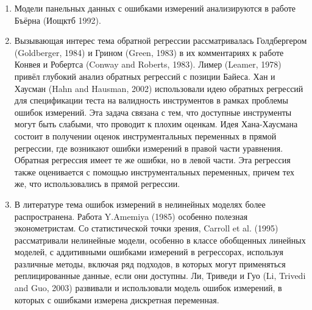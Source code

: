 \begin{enumerate}
\item Модели панельных данных с ошибками измерений анализируются в работе Бъёрна (Иощктб 1992).
\item Вызывающая интерес тема обратной регрессии рассматривалась Голдбергером (Goldberger, 1984) и Грином (Green, 1983) в их комментариях к работе Конвея и Робертса (Conway and Roberts, 1983). Лимер (Leamer, 1978) привёл глубокий анализ обратных регрессий с позиции Байеса. Хан и Хаусман (Hahn and Hausman, 2002) использовали идею обратных регрессий для спецификации теста на валидность инструментов в рамках проблемы ошибок измерений. Эта задача связана с тем, что доступные инструменты могут быть слабыми, что проводит к плохим оценкам. Идея Хана-Хаусмана состоит в получении оценок инструментальных переменных в прямой регрессии, где возникают ошибки измерений в правой части уравнения. Обратная регрессия имеет те же ошибки, но в левой части. Эта регрессия также оценивается с помощью инструментальных переменных, причем тех же, что использовались в прямой регрессии.
\item В литературе тема ошибок измерений в нелинейных моделях более распространена. Работа Y.Amemiya (1985) особенно полезная эконометристам. Со статистической точки зрения, Carroll et al. (1995) рассматривали нелинейные модели, особенно в классе обобщенных линейных моделей, с аддитивными ошибками измерений в регрессорах, используя различные методы, включая ряд подходов, в которых могут применяться реплицированные данные, если они доступны. Ли, Триведи и Гуо (Li, Trivedi and Guo, 2003) развивали и использовали модель ошибок измерений, в которых с ошибками измерена дискретная переменная.
\end{enumerate}



